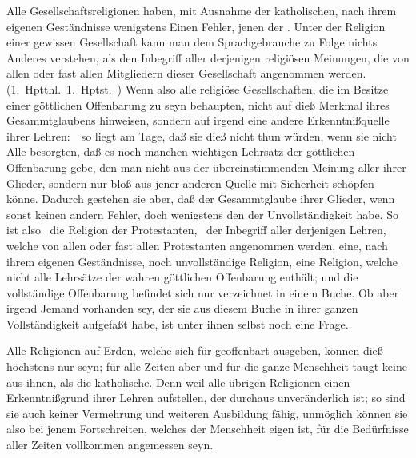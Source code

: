 \begin{aufza}
\item Alle Gesellschaftsreligionen haben, mit Ausnahme der katholischen, nach ihrem eigenen Geständnisse wenigstens Einen Fehler, jenen der . Unter der Religion einer gewissen Gesellschaft kann man dem Sprachgebrauche zu Folge nichts Anderes verstehen, als den Inbegriff aller derjenigen religiösen Meinungen, die von allen oder fast allen Mitgliedern dieser Gesellschaft angenommen werden. (1.~Hptthl.\ 1.~Hptst.\ ) Wenn also alle religiöse Gesellschaften, die im Besitze einer göttlichen Offenbarung zu seyn behaupten, nicht auf dieß Merkmal ihres Gesammtglaubens hinweisen, sondern auf irgend eine andere Erkenntnißquelle ihrer Lehren:~\ so liegt am Tage, daß sie dieß nicht thun würden, wenn sie nicht Alle besorgten, daß es noch manchen wichtigen Lehrsatz der göttlichen Offenbarung gebe, den man nicht aus der übereinstimmenden Meinung aller ihrer Glieder, sondern nur bloß aus jener anderen Quelle mit Sicherheit schöpfen könne. Dadurch gestehen sie aber, daß der Gesammtglaube ihrer Glieder, wenn sonst keinen andern Fehler, doch wenigstens den der Unvollständigkeit habe. So ist also \zB\ die Religion der Protestanten, \dh\ der Inbegriff aller derjenigen Lehren, welche von allen oder fast allen Protestanten angenommen werden, eine, nach ihrem eigenen Geständnisse, noch unvollständige Religion, eine Religion, welche nicht alle Lehrsätze der wahren göttlichen Offenbarung enthält; und die vollständige Offenbarung befindet sich nur verzeichnet in einem Buche. Ob aber irgend Jemand vorhanden sey, der sie aus diesem Buche in ihrer ganzen Vollständigkeit aufgefaßt habe, ist unter ihnen selbst noch eine Frage.
\item Alle Religionen auf Erden, welche sich für geoffenbart ausgeben, können dieß höchstens nur  seyn; für alle Zeiten aber und für die ganze Menschheit taugt keine aus ihnen, als die katholische. Denn weil alle übrigen Religionen einen Erkenntnißgrund ihrer Lehren aufstellen, der durchaus unveränderlich ist; so sind sie auch keiner Vermehrung und weiteren Ausbildung fähig, unmöglich können sie also bei jenem Fortschreiten, welches der Menschheit eigen ist, für die Bedürfnisse aller Zeiten vollkommen angemessen seyn.
\end{aufza}

